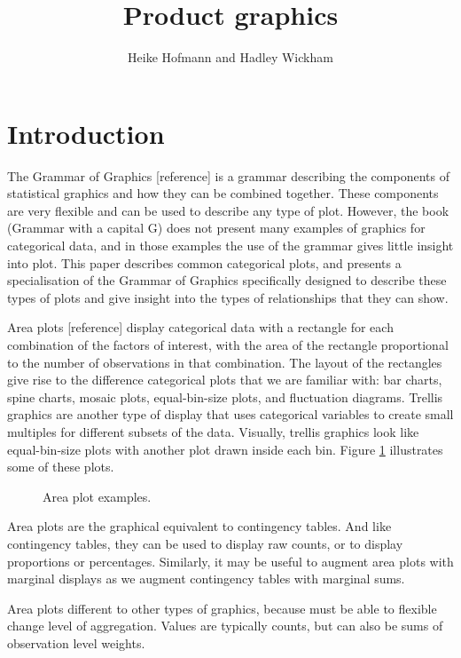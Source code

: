\documentclass[letterpaper,oneside]{scrartcl}
\title{Product graphics}
\author{Heike Hofmann and Hadley Wickham}
\begin{document}
\maketitle
  
  
\section{Introduction}


The Grammar of Graphics [reference] is a grammar describing the components of statistical graphics and how they can be combined together.  These components are very flexible and can be used to describe any type of plot.  However, the book (Grammar with a capital G) does not present many examples of graphics for categorical data, and in those examples the use of the grammar gives little insight into plot.  This paper describes common categorical plots, and presents a specialisation of the Grammar of Graphics specifically designed to describe these types of plots and give insight into the types of relationships that they can show.  

Area plots [reference] display categorical data with a rectangle for each combination of the factors of interest, with the area of the rectangle proportional to the number of observations in that combination.  The layout of the rectangles give rise to the difference categorical plots that we are familiar with: bar charts, spine charts, mosaic plots, equal-bin-size plots, and fluctuation diagrams.  Trellis graphics are another type of display that uses categorical variables to create small multiples for different subsets of the data.  Visually, trellis graphics look like equal-bin-size plots with another plot drawn inside each bin.  Figure \ref{fig:cat-examples} illustrates some of these plots.

\begin{figure}[htbp]
  \begin{center}
  \end{center}
  \caption{Area plot examples.}
  \label{fig:cat-examples}
\end{figure}

Area plots are the graphical equivalent to contingency tables.  And like contingency tables, they can be used to display raw counts, or to display proportions or percentages.  Similarly, it may be useful to augment area plots with marginal displays as we augment contingency tables with marginal sums.

Area plots different to other types of graphics, because must be able to flexible change level of aggregation.  Values are typically counts, but can also be sums of observation level weights.
\end{document}
